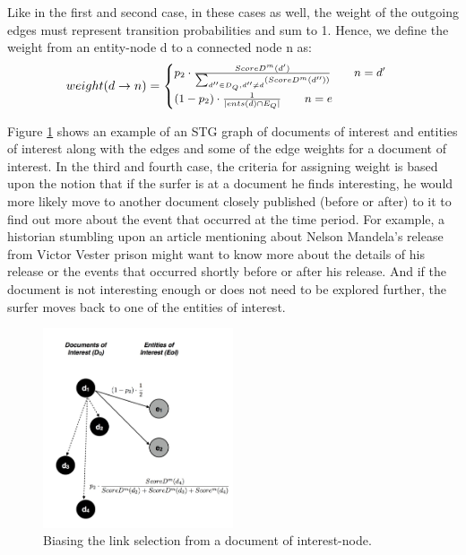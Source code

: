 \documentclass{article}
\begin{document}
\vspace{2mm}\noindent
Like in the first and second case, in these cases as well, the weight of the 
outgoing edges must represent transition probabilities and sum to 1. Hence, we 
define the weight from an entity-node d to a connected node n as:
\begin{gather}
\small
weight(d \rightarrow n) = \begin{cases}
    p_2 \cdot \frac{ScoreD^{m}(d')}{\sum_{d'' \in D_Q , d'' \neq d}(ScoreD^{m}(d''))}
    \qquad n = d'\\
    (1-p_2) \cdot \frac{1}{|ents(d) \cap E_Q|} 
    \qquad n = e
\end{cases}
\end{gather}

\vspace{2mm}\noindent
Figure \ref{fig:doi_weighting} shows an example of an STG graph of documents of interest and entities
of interest along with the edges and 
some of the edge weights for a document of interest.
In the third and fourth case, the criteria for assigning weight is based upon the 
notion that if the surfer is at a document he finds interesting, he would more likely
move to another document closely published (before or after) to it to find out 
more about the event that occurred at the time period. 
For example, a historian stumbling upon an article mentioning about 
Nelson Mandela's release from Victor Vester prison might want to know
more about the details of his release or the events that occurred shortly
before or after his release. 
And if the document is not interesting enough or does not need to be 
explored further, the surfer moves back to one of the entities of interest.    

\begin{figure}[ht]
\begin{mdframed}
	\centering
	\includegraphics[width=0.5\textwidth]{doi_weighting}
\end{mdframed}
	\caption{Biasing the link selection from a document of interest-node.}
	\label{fig:doi_weighting}
\end{figure}
\end{document}
